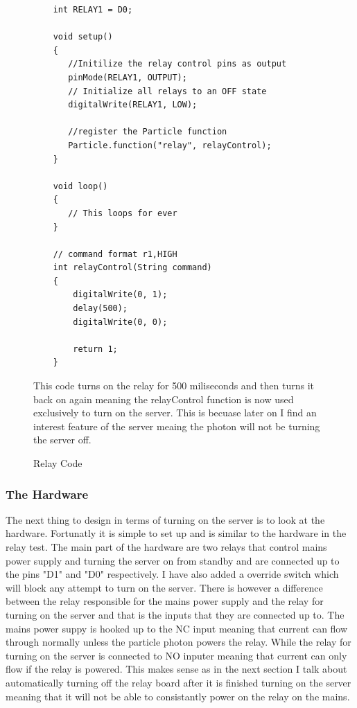 \documentclass{article}
\begin{document}
\begin{figure}
    \begin{lstlisting}
    int RELAY1 = D0;

    void setup()
    {
       //Initilize the relay control pins as output
       pinMode(RELAY1, OUTPUT);
       // Initialize all relays to an OFF state
       digitalWrite(RELAY1, LOW);

       //register the Particle function
       Particle.function("relay", relayControl);
    }

    void loop()
    {
       // This loops for ever
    }

    // command format r1,HIGH
    int relayControl(String command)
    {
        digitalWrite(0, 1);
        delay(500);
        digitalWrite(0, 0);

        return 1;
    }
    \end{lstlisting}
    \caption{Relay Code} \label{fig:relayCode}
    \vspace{0.5cm}
    This code turns on the relay for 500 miliseconds and then turns it back on again
    meaning the relayControl function is now used exclusively to turn on the server.
    This is becuase later on I find an interest feature of the server meaing the photon
    will not be turning the server off.

\end{figure}

\subsubsection{The Hardware}
The next thing to design in terms of turning on the server is to look at the hardware.
Fortunatly it is simple to set up and is similar to the hardware in the relay test. The main
part of the hardware are two relays that control mains power supply and turning the server on
from standby and are connected up to the pins "D1" and "D0" respectively. I have also added a
override switch which will block any attempt to turn on the server. There is however a difference
between the relay responsible for the mains power supply and the relay for turning on the server
and that is the inputs that they are connected up to. The mains power suppy is hooked up to the NC
input meaning that current can flow through normally unless the particle photon powers the relay. While
the relay for turning on the server is connected to NO inputer meaning that current can only flow
if the relay is powered. This makes sense as in the next section I talk about automatically turning
off the relay board after it is finished turning on the server meaning that it will not be able to
consistantly power on the relay on the mains.
\end{document}
